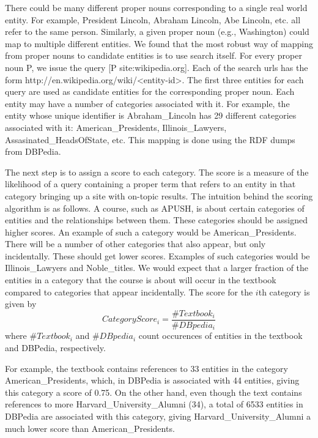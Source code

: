 \documentclass[pdfpagelabels=false,plainpages=true]{acm_proc_article-sp}
\begin{document}
There could be many different proper nouns corresponding to a single real world
entity. For example, President Lincoln, Abraham Lincoln, Abe Lincoln, etc. all
refer to the same person. Similarly, a given proper noun (e.g., Washington) could
map to multiple different entities. We found that the most robust way of mapping
from proper nouns to candidate entities is to use search itself. For every
proper noun P, we issue the query [P site:wikipedia.org]. Each of the search
urls has the form http://en.wikipedia.org/wiki/<entity-id>. The first three entities
for each query are used as candidate entities for the corresponding proper
noun. Each entity may have a number of categories associated with it. For
example, the entity whose unique identifier is Abraham\_Lincoln has 29
different categories associated with it: American\_Presidents,
Illinois\_Lawyers, Assasinated\_HeadsOfState, etc. This mapping is done using
the RDF dumps from DBPedia. 

The next step is to assign a score to each category. The score is a measure of
the likelihood of a query containing a proper term that refers to an entity in
that category bringing up a site with on-topic results. The intuition behind the
scoring algorithm is as follows. A course, such as APUSH, is about certain
categories of entities and the relationships between them. These categories
should be assigned higher scores. An example of such a category would be
American\_Presidents. There will be a number of other categories that also
appear, but only incidentally. These should get lower scores. Examples of such
categories would be Illinois\_Lawyers and Noble\_titles. We would expect that a
larger fraction of the entities in a category that the course is about will
occur in the textbook compared to categories that appear incidentally. The score
for the $i$th category is given by
\begin{equation}
CategoryScore_i = \frac{\#Textbook_i}{\#DBpedia_i}
\end{equation}
where $\#Textbook_i$ and $\#DBpedia_i$ count occurences of entities in the
textbook and DBPedia, respectively. 

For example, the textbook contains references to 33 entities in the category
American\_Presidents, which, in DBPedia is associated with 44 entities, giving
this category a score of 0.75. On the other hand, even though the text contains
references to more Harvard\_University\_Alumni (34), a total of 6533 entities in
DBPedia are associated with this category, giving Harvard\_University\_Alumni a
much lower score than American\_Presidents. 
\end{document}
